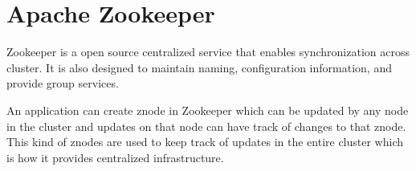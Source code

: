 \section{Apache Zookeeper}

Zookeeper is a open source centralized service that enables synchronization
across cluster. It is also designed to maintain naming, configuration
information, and provide  group services.

An application can create znode in Zookeeper which can be updated by any node in
the cluster and updates on that node can have track of changes to that znode.
This kind of znodes are used to keep track of updates in the entire cluster
which is how it provides centralized infrastructure\cite{hid-
sp18-421-zookeeper}.


